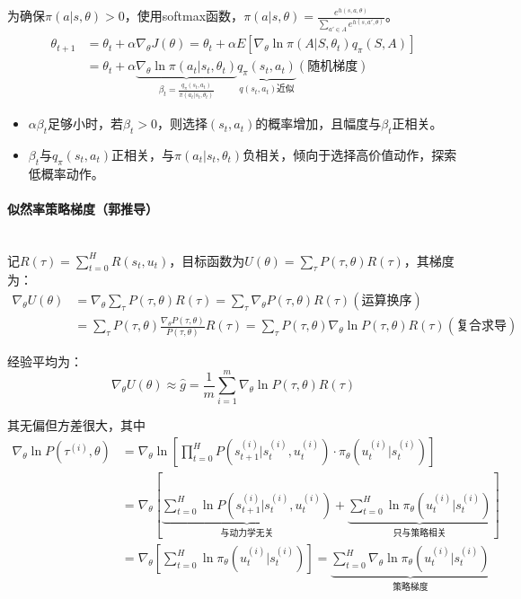 \documentclass[
12pt, %
a4paper, 
oneside, %
headinclude,footinclude, %
]{scrartcl}
\begin{document}
为确保$ \pi(a|s, \theta) > 0 $，使用softmax函数，$ \pi(a|s, \theta) = \frac{e^{h(s, a, \theta)}}{\sum_{a' \in A} e^{h(s, a', \theta)}} $。
\begin{align*}
\theta_{t + 1} &= \theta_t + \alpha\nabla_\theta J(\theta) = \theta_t + \alpha E[\nabla_\theta \ln \pi(A|S, \theta_t) q_\pi(S, A)] \\
&= \theta_t + \alpha \underbrace{\nabla_\theta \ln \pi(a_t|s_t, \theta_t)}_{\beta_t = \frac{q_\pi(s_t, a_t)}{\pi(a_t|s_t, \theta_t)}} \underbrace{q_\pi(s_t, a_t)}_{q(s_t, a_t)\text{近似}} (\text{随机梯度})
\end{align*}    

\begin{itemize}
\item $ \alpha\beta_t $足够小时，若$ \beta_t > 0 $，则选择$ (s_t, a_t) $的概率增加，且幅度与$ \beta_t $正相关。
\item $ \beta_t $与$ q_{\pi}(s_t, a_t) $正相关，与$ \pi(a_t|s_t, \theta_t) $负相关，倾向于选择高价值动作，探索低概率动作。
\end{itemize}
\paragraph{似然率策略梯度（郭推导）}~\\

记$ R(\tau) = \sum_{t = 0}^H R(s_t, u_t) $，目标函数为$ U(\theta) = \sum_{\tau} P(\tau, \theta) R(\tau) $，其梯度为：
\begin{align*}
\nabla_\theta U(\theta) &= \nabla_\theta \sum_{\tau} P(\tau, \theta) R(\tau) = \sum_{\tau} \nabla_\theta P(\tau, \theta) R(\tau) (\text{运算换序}) \\
&= \sum_{\tau} P(\tau, \theta) \frac{\nabla_\theta P(\tau, \theta)}{P(\tau, \theta)} R(\tau) = \sum_{\tau} P(\tau, \theta) \nabla_\theta \ln P(\tau, \theta) R(\tau) (\text{复合求导})
\end{align*}

经验平均为：
$$ \nabla_\theta U(\theta) \approx \hat{g} = \frac{1}{m} \sum_{i = 1}^m \nabla_\theta \ln P(\tau, \theta) R(\tau) $$

其无偏但方差很大，其中
\begin{align*}
\nabla_\theta\ln P(\tau^{(i)}, \theta) &= \nabla_\theta\ln[\prod_{t = 0}^{H} P(s_{t + 1}^{(i)}|s_t^{(i)}, u_t^{(i)}) \cdot \pi_\theta(u_t^{(i)}|s_t^{(i)})] \\
&= \nabla_\theta[\underbrace{\sum_{t = 0}^{H} \ln P(s_{t + 1}^{(i)}|s_t^{(i)}, u_t^{(i)})}_{\text{与动力学无关}} + \underbrace{\sum_{t = 0}^{H}\ln\pi_\theta(u_t^{(i)}|s_t^{(i)})}_{\text{只与策略相关}}] \\
&= \nabla_\theta[\sum_{t = 0}^{H} \ln\pi_\theta(u_t^{(i)}|s_t^{(i)})] = \underbrace{\sum_{t = 0}^{H} \nabla_\theta\ln\pi_\theta(u_t^{(i)}|s_t^{(i)})}_{\text{策略梯度}} 
\end{align*}
\end{document}
